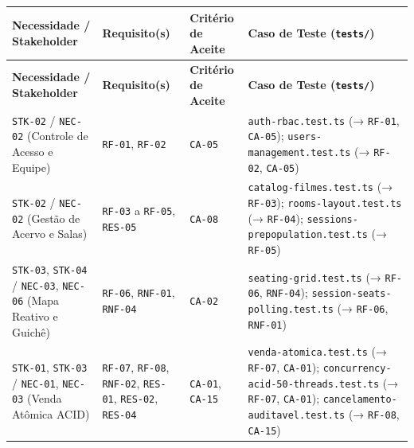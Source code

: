 {\footnotesize
\begin{xltabular}{\textwidth}{>{\hsize\sloppy\arraybackslash}X >{\hsize\centering\arraybackslash}X >{\hsize\centering\arraybackslash}X >{\hsize\sloppy\arraybackslash}X}
\toprule
{}
\textbf{Necessidade / Stakeholder} & \textbf{Requisito(s)} & \textbf{Critério de Aceite} & \textbf{Caso de Teste (\texttt{tests/})} \\
\midrule
{}
\endfirsthead
{}\toprule
{}
\textbf{Necessidade / Stakeholder} & \textbf{Requisito(s)} & \textbf{Critério de Aceite} & \textbf{Caso de Teste (\texttt{tests/})} \\
\midrule
{}
\endhead
{}\bottomrule
{}
\endfoot
{}\bottomrule
{}
\endlastfoot
\texttt{STK-02} / \texttt{NEC-02} (Controle de Acesso e Equipe) & \texttt{RF-01}, \texttt{RF-02} & \texttt{CA-05} & \texttt{auth-\allowbreak{}rbac.\allowbreak{}test.\allowbreak{}ts} (→ \texttt{RF-01}, \texttt{CA-05}); \texttt{users-\allowbreak{}management.\allowbreak{}test.\allowbreak{}ts} (→ \texttt{RF-02}, \texttt{CA-05}) \\
\midrule
\texttt{STK-02} / \texttt{NEC-02} (Gestão de Acervo e Salas) & \texttt{RF-03} a \texttt{RF-05}, \texttt{RES-05} & \texttt{CA-08} & \texttt{catalog-\allowbreak{}filmes.\allowbreak{}test.\allowbreak{}ts} (→ \texttt{RF-03}); \texttt{rooms-\allowbreak{}layout.\allowbreak{}test.\allowbreak{}ts} (→ \texttt{RF-04}); \texttt{sessions-\allowbreak{}prepopulation.\allowbreak{}test.\allowbreak{}ts} (→ \texttt{RF-05}) \\
\midrule
\texttt{STK-03}, \texttt{STK-04} / \texttt{NEC-03}, \texttt{NEC-06} (Mapa Reativo e Guichê) & \texttt{RF-06}, \texttt{RNF-01}, \texttt{RNF-04} & \texttt{CA-02} & \texttt{seating-\allowbreak{}grid.\allowbreak{}test.\allowbreak{}ts} (→ \texttt{RF-06}, \texttt{RNF-04}); \texttt{session-\allowbreak{}seats-\allowbreak{}polling.\allowbreak{}test.\allowbreak{}ts} (→ \texttt{RF-06}, \texttt{RNF-01}) \\
\midrule
\texttt{STK-01}, \texttt{STK-03} / \texttt{NEC-01}, \texttt{NEC-03} (Venda Atômica ACID) & \texttt{RF-07}, \texttt{RF-08}, \texttt{RNF-02}, \texttt{RES-01}, \texttt{RES-02}, \texttt{RES-04} & \texttt{CA-01}, \texttt{CA-15} & \texttt{venda-\allowbreak{}atomica.\allowbreak{}test.\allowbreak{}ts} (→ \texttt{RF-07}, \texttt{CA-01}); \texttt{concurrency-\allowbreak{}acid-\allowbreak{}50-\allowbreak{}threads.\allowbreak{}test.\allowbreak{}ts} (→ \texttt{RF-07}, \texttt{CA-01}); \texttt{cancelamento-\allowbreak{}auditavel.\allowbreak{}test.\allowbreak{}ts} (→ \texttt{RF-08}, \texttt{CA-15}) \\

\end{xltabular}}
